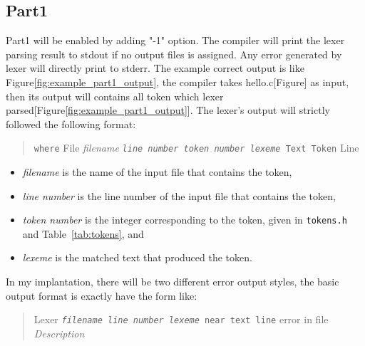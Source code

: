 \documentclass{article}
\begin{document}
	\subsection{Part1}\label{subsec:part1}
	Part1 will be enabled by adding "-1" option. The compiler will print the lexer parsing result to stdout if no output
	files is assigned. Any error generated by lexer will directly print to stderr. The example correct output is like
	Figure\ref{fig:example_part1_output}, the compiler takes hello.c[Figure] as input, then its output will contains all
	token which lexer parsed[Figure\ref{fig:example_part1_output}]. The lexer's output will strictly followed the
	following format:
	\begin{quote}
	{\texttt{where} File}
		\emph{filename}
		{\texttt{\emph{line number}
		{\texttt{\emph{token number}
		{\texttt{\emph{lexeme}} Text}} Token}} Line}
	\end{quote}

	\begin{itemize}
		\item \emph{filename}
		is the name of the input file that contains the token,
		\item \emph{line number}
		is the line number of the input file that contains the token,
		\item \emph{token number}
		is the integer corresponding to the token, given in \verb|tokens.h|
		and Table~\ref{tab:tokens}, and
		\item \emph{lexeme}
		is the matched text that produced the token.
	\end{itemize}

	In my implantation, there will be two different error output styles, the basic output format is exactly have the form like:
	\begin{quote}
		\begin{tabbing}
		{\texttt{} Lexer} \= {\texttt{\emph{filename}
		{\texttt{\emph{line number}
		{\texttt{\emph{lexeme}} near text}} line}} error in file}
		\\
		\> \emph{Description}
		\end{tabbing}
	\end{quote}
\end{document}
